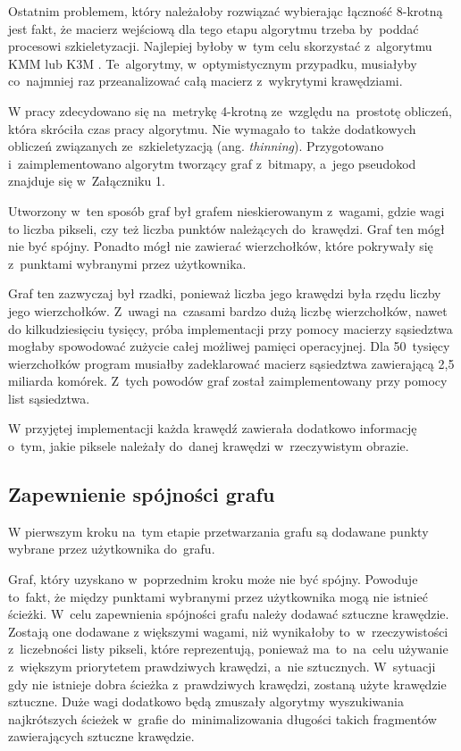 \documentclass[a4paper,11pt,twoside,openright]{report}
\theoremstyle{definition}
\begin{document}
Ostatnim problemem, który należałoby rozwiązać wybierając łączność 8-krotną
jest fakt, że macierz wejściową dla tego etapu algorytmu trzeba by~poddać procesowi
szkieletyzacji. Najlepiej byłoby w~tym celu skorzystać z~algorytmu KMM \cite{KMM}
lub K3M \cite{K3M}. Te~algorytmy, w~optymistycznym przypadku, musiałyby co~najmniej
raz przeanalizować całą macierz z~wykrytymi krawędziami.

\bigskip

W pracy zdecydowano się na~metrykę 4-krotną ze~względu na~prostotę obliczeń,
która skróciła czas pracy algorytmu. Nie wymagało to~także dodatkowych
obliczeń związanych ze~szkieletyzacją (ang. \textit{thinning}). Przygotowano
i~zaimplementowano algorytm tworzący graf z~bitmapy, a~jego pseudokod znajduje
się w~Załączniku 1.

Utworzony w~ten sposób graf był grafem nieskierowanym z~wagami, gdzie wagi to
liczba pikseli, czy też liczba punktów należących do~krawędzi. Graf ten mógł nie być
spójny. Ponadto mógł nie zawierać wierzchołków, które pokrywały się z~punktami
wybranymi przez użytkownika.

Graf ten zazwyczaj był rzadki, ponieważ liczba jego krawędzi była rzędu liczby
jego wierzchołków.  Z~uwagi na~czasami bardzo dużą liczbę wierzchołków, nawet
do kilkudziesięciu tysięcy, próba implementacji przy pomocy macierzy sąsiedztwa
mogłaby spowodować zużycie całej możliwej pamięci operacyjnej. Dla 50~tysięcy
wierzchołków program musiałby zadeklarować macierz sąsiedztwa zawierającą 2,5
miliarda komórek. Z~tych powodów graf został zaimplementowany przy pomocy list sąsiedztwa.

W przyjętej implementacji każda krawędź zawierała dodatkowo informację o~tym, jakie
piksele należały do~danej krawędzi w~rzeczywistym obrazie.

\subsection {Zapewnienie spójności grafu}

W pierwszym kroku na~tym etapie przetwarzania grafu są dodawane punkty wybrane
przez użytkownika do~grafu.

Graf, który uzyskano w~poprzednim kroku może nie być spójny. Powoduje to~fakt,
że między punktami wybranymi przez użytkownika mogą nie istnieć ścieżki. W~celu
zapewnienia spójności grafu należy dodawać sztuczne krawędzie. Zostają one dodawane
z większymi wagami, niż wynikałoby to~w~rzeczywistości z~liczebności listy pikseli,
które reprezentują, ponieważ ma~to~na~celu używanie z~większym priorytetem prawdziwych
krawędzi, a~nie sztucznych. W~sytuacji gdy nie istnieje dobra ścieżka z~prawdziwych
krawędzi, zostaną użyte krawędzie sztuczne. Duże wagi dodatkowo będą zmuszały
algorytmy wyszukiwania najkrótszych ścieżek w~grafie do~minimalizowania długości
takich fragmentów zawierających sztuczne krawędzie.
\end{document}
